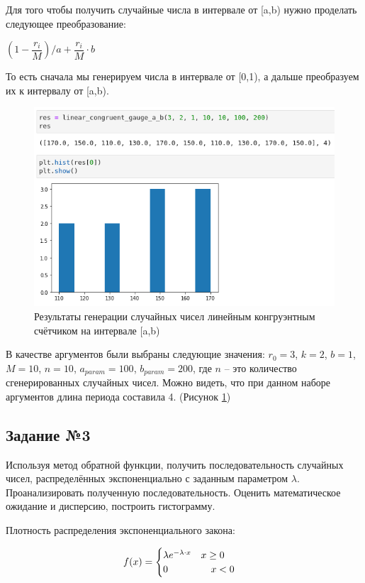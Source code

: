 \documentclass[14pt,fleqn]{extarticle}
\begin{document}
	Для того чтобы получить случайные числа в интервале от [a,b) нужно проделать следующее преобразование:
	\begin{center}
		$(1 - \dfrac{r_i}{M})/a + \dfrac{r_i}{M} \cdot b$
	\end{center}
	То есть сначала мы генерируем числа в интервале от [0,1), а дальше преобразуем их к интервалу от [a,b).
 	\begin{figure}[h]
		\centering \includegraphics[scale=0.52]{linear_congruent_gauge_a_b_result}
		\caption{Результаты генерации случайных чисел линейным конгруэнтным счётчиком на интервале [a,b)}
		\label{fig:linear_congruent_gauge_a_b_result}
	\end{figure}
    \newpage
	В качестве аргументов были выбраны следующие значения: $r_0 = 3$, $k = 2$, $b = 1$, $M = 10$, $n = 10$, $a_{param} = 100$, $b_{param} = 200$, где $n$ -- это количество сгенерированных случайных чисел. Можно видеть, что при данном наборе аргументов длина периода составила 4. (Рисунок \ref{fig:linear_congruent_gauge_a_b_result})\\
	
	\subsection*{Задание №3}
	Используя метод обратной функции, получить последовательность случайных чисел, распределённых экспоненциально с заданным параметром $\lambda$. Проанализировать полученную последовательность. Оценить математическое ожидание  и дисперсию, построить гистограмму.\\
	\newline
	
	Плотность распределения экспоненциального закона:
	\begin{ceqn}
	\begin{align*}
		f(x) =
		\begin{cases}
			\lambda e^{-\lambda \cdot x} \quad x \geq 0\\
			0 \hspace{1.55cm} x < 0
		\end{cases}
	\end{align*}
	\end{ceqn}
\end{document}
